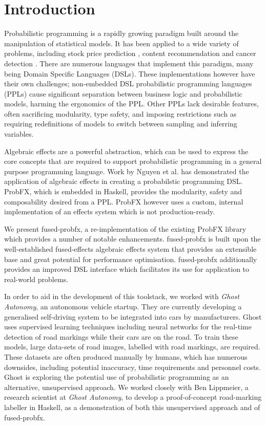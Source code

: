 \documentclass[conference]{IEEEtran}
\begin{document}
\section{Introduction}
Probabilistic programming is a rapidly growing paradigm built around the manipulation of statistical models. It has been applied to a wide variety of problems, including stock price prediction \cite{zhang2016stock}, content recommendation \cite{popescul2013probabilistic} and cancer detection \cite{seal2018predictive}. There are numerous languages that implement this paradigm, many being Domain Specific Languages (DSLs). These implementations however have their own challenges; non-embedded DSL probabilistic programming languages (PPLs) cause significant separation between business logic and probabilistic models, harming the ergonomics of the PPL. Other PPLs lack desirable features, often sacrificing modularity, type safety, and imposing restrictions such as requiring redefinitions of models to switch between sampling and inferring variables.
\par
Algebraic effects are a powerful abstraction, which can be used to express the core concepts that are required to support probabilistic programming in a general purpose programming language. Work by Nguyen et al.\cite{probfx} has demonstrated the application of algebraic effects in creating a probabilstic programming DSL. ProbFX, which is embedded in Haskell, provides the modularity, safety and composability desired from a PPL. ProbFX however uses a custom, internal implementation of an effects system which is not production-ready.
\par
We present fused-probfx, a re-implementation of the existing ProbFX library which provides a number of notable enhancements. fused-probfx is built upon the well-established fused-effects\cite{FusedEffects} algebraic effects system that provides an extensible base and great potential for performance optimisation. fused-probfx additionally provides an improved DSL interface which facilitates its use for application to real-world problems.
\par
In order to aid in the development of this toolstack, we worked with \textit{Ghost Autonomy}, an autonomous vehicle startup. They are currently developing a generalised self-driving system to be integrated into cars by manufacturers. Ghost uses supervised learning techniques including neural networks for the real-time detection of road markings while their cars are on the road. To train these models, large data-sets of road images, labelled with road markings, are required. These datasets are often produced manually by humans, which has numerous downsides, including potential inaccuracy, time requirements and personnel costs. Ghost is exploring the potential use of probabilistic programming as an alternative, unsupervised approach. We worked closely with Ben Lippmeier, a research scientist at \textit{Ghost Autonomy}, to develop a proof-of-concept road-marking labeller in Haskell, as a demonstration of both this unsupervised approach and of fused-probfx. %
\end{document}

